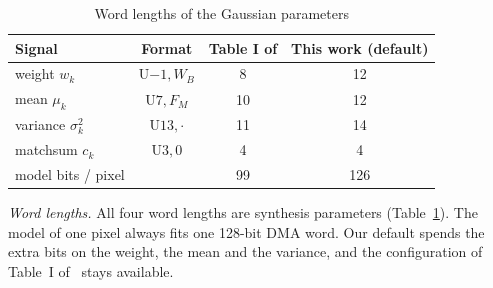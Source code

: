 \documentclass[conference]{IEEEtran}
\begin{document}
\begin{table}[!t]
\caption{Word lengths of the Gaussian parameters}
\label{tab:fxp}
\centering
\begin{tabular}{@{}lccc@{}}
\toprule
Signal & Format & Table I of \cite{genovese2014} & This work (default)\\
\midrule
weight $w_k$            & U$-1,W_B$  & 8  & 12\\
mean $\mu_k$            & U$7,F_M$   & 10 & 12\\
variance $\sigma_k^2$   & U$13,\cdot$ & 11 & 14\\
matchsum $c_k$          & U$3,0$     & 4  & 4\\
\midrule
model bits / pixel      &            & 99 & 126\\
\bottomrule
\end{tabular}
\end{table}

\emph{Word lengths.} All four word lengths are synthesis parameters
(Table~\ref{tab:fxp}). The model of one pixel always fits one 128-bit DMA word.
Our default spends the extra bits on the weight, the mean and the variance, and
the configuration of Table~I of~\cite{genovese2014} stays available.
\end{document}
